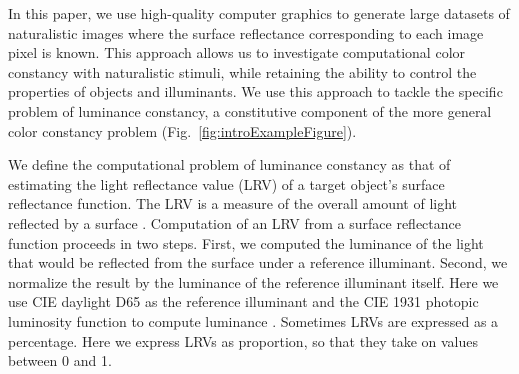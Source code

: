 \documentclass{jov}
\begin{document}
In this paper, we use high-quality computer graphics to generate large datasets of naturalistic images where the surface reflectance corresponding to each image pixel is known. 
This approach allows us to investigate computational color constancy with naturalistic stimuli, while retaining the ability to control the properties of objects and illuminants. We use this approach to tackle the specific problem of luminance constancy, a constitutive component of the more general color constancy problem (Fig.~\ref{fig:introExampleFigure}). 

We define the computational problem of luminance constancy as that of estimating the light reflectance value (LRV) of a target object's surface reflectance function.
The LRV is a measure of the overall amount of light reflected by a surface \cite{astm1121477}.
Computation of an LRV from a surface reflectance function proceeds in two steps.
First, we computed the luminance of the light that would be reflected from the surface under a reference illuminant.
Second, we normalize the result by the luminance of the reference illuminant itself.
Here we use CIE daylight D65 as the reference illuminant and the CIE 1931 photopic luminosity function to compute luminance \cite{CIE86}.
Sometimes LRVs are expressed as a percentage.
Here we express LRVs as proportion, so that they take on values between 0 and 1.
\end{document}
